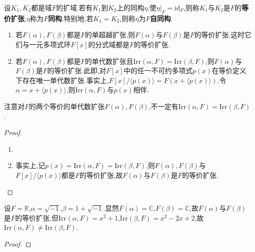 \documentclass[../../main.tex]{subfiles}%
\begin{document}
\begin{definition}
设$K_1,K_2$都是域$F$的扩域.若有$K_1$到$K_2$上的同构$\eta$,使$\eta|_F=\mathrm{id}_F$,则称$K_1$与$K_2$是$F$的\textbf{等价扩张},$\eta$称为\textbf{$F$同构}.特别地,若$K_1=K_2$,则称$\eta$为$F$\textbf{自同构}.
\end{definition}

\begin{proposition}\label{proposition:等价扩张的基本结论--抽象代数}
\begin{enumerate}[(1)]
\item\label{proposition:等价扩张的基本结论--抽象代数-1} 若$F(\alpha),F(\beta)$都是$F$的单超越扩张,则$F(\alpha)$与$F(\beta)$是$F$的等价扩张.这时它们与一元多项式环$F[x]$的分式域都是$F$的等价扩张.

\item\label{proposition:等价扩张的基本结论--抽象代数-2} 若$F(\alpha),F(\beta)$都是$F$的单代数扩张且$\mathrm{Irr}(\alpha,F)=\mathrm{Irr}(\beta,F)$,则$F(\alpha)$与$F(\beta)$是$F$的等价扩张.此即,对$F[x]$中的任一不可约多项式$p(x)$在等价定义下存在唯一单代数扩张.事实上,$F[x]/\langle p(x)\rangle=F(x+\langle p(x)\rangle)$.令$\alpha=x+\langle p(x)\rangle$,则$\mathrm{Irr}(\alpha,F)$与$p(x)$相伴.
\end{enumerate}
\end{proposition}
\begin{remark}
注意对$F$的两个等价的单代数扩张$F(\alpha),F(\beta)$,不一定有$\mathrm{Irr}(\alpha,F)=\mathrm{Irr}(\beta,F)$.
\end{remark}
\begin{proof}
\begin{enumerate}[(1)]
\item 

\item 事实上,记$p(x)=\mathrm{Irr}(\alpha,F)=\mathrm{Irr}(\beta,F)$,则$F(\alpha),F(\beta)$与$F[x]/\langle p(x)\rangle$都是$F$的等价扩张,故$F(\alpha)$与$F(\beta)$是$F$的等价扩张.
\end{enumerate}
\end{proof}

\begin{example}\label{example:抽象代数--例题3.1.3}
设$F=\mathbb{R}$,$\alpha=\sqrt{-1}$,$\beta=1+\sqrt{-1}$.显然$F(\alpha)=\mathbb{C}$,$F(\beta)=\mathbb{C}$,故$F(\alpha)$与$F(\beta)$是$F$的等价扩张,但$\mathrm{Irr}(\alpha,F)=x^2+1$,$\mathrm{Irr}(\beta,F)=x^2-2x+2$,故$\mathrm{Irr}(\alpha,F)\neq\mathrm{Irr}(\beta,F)$.
\end{example}
\begin{proof}

\end{proof}
\end{document}
